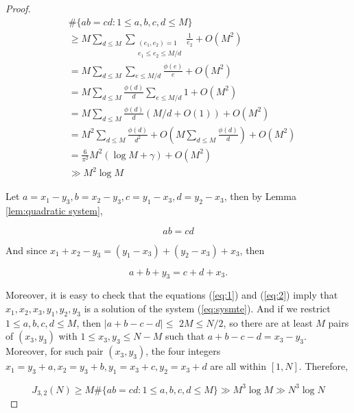 \begin{proof}
$$
\begin{aligned}
& \#\{a b=c d: 1 \leq a, b, c, d \leq M\} \\
& \geq M \sum_{d \leq M} \sum_{\substack{\left(e_{1}, e_{2}\right)=1 \\
e_{1} \leq e_{2} \leq M / d}} \frac{1}{e_{2}}+O\left(M^{2}\right) \\
& =M \sum_{d \leq M} \sum_{e \leq M / d} \frac{\phi(e)}{e}+O\left(M^{2}\right) \\
& =M \sum_{d \leq M} \frac{\phi(d)}{d} \sum_{e \leq M / d} 1+O\left(M^{2}\right) \\
& =M \sum_{d \leq M} \frac{\phi(d)}{d}(M / d+O(1))+O\left(M^{2}\right) \\
& =M^{2} \sum_{d \leq M} \frac{\phi(d)}{d^{2}}+O\left(M \sum_{d \leq M} \frac{\phi(d)}{d}\right)+O\left(M^{2}\right) \\
& =\frac{6}{\pi^{2}} M^{2}\left(\log M+\gamma\right)+O\left(M^{2}\right) \\
& \gg M^{2} \log M
\end{aligned}
$$

Let $a=x_{1}-y_{3}, b=x_{2}-y_{3}, c=y_{1}-x_{3}, d=y_{2}-x_{3}$, then by Lemma \ref{lem:quadratic system},


\begin{equation}\label{eq:1}
a b=c d 
\end{equation}


And since $x_{1}+x_{2}-y_{3}=\left(y_{1}-x_{3}\right)+\left(y_{2}-x_{3}\right)+x_{3}$, then


\begin{equation}\label{eq:2}
a+b+y_{3}=c+d+x_{3} . 
\end{equation}


Moreover, it is easy to check that the equations (\ref{eq:1}) and (\ref{eq:2}) imply that $x_{1}, x_{2}, x_{3}, y_{1}, y_{2}, y_{3}$ is a solution of the system (\ref{eq:sysmte}). And if we restrict $1 \leq a, b, c, d \leq M$, then $|a+b-c-d| \leq$ $2 M \leq N / 2$, so there are at least $M$ pairs of $\left(x_{3}, y_{3}\right)$ with $1 \leq x_{3}, y_{3} \leq N-M$ such that $a+b-c-d=x_{3}-y_{3}$. Moreover, for such pair $\left(x_{3}, y_{3}\right)$, the four integers $x_{1}=y_{3}+a, x_{2}=y_{3}+b, y_{1}=x_{3}+c, y_{2}=x_{3}+d$ are all within $[1, N]$. Therefore,

$$
J_{3,2}(N) \geq M \#\{a b=c d: 1 \leq a, b, c, d \leq M\} \gg M^{3} \log M \gg N^{3} \log N
$$
\end{proof}


